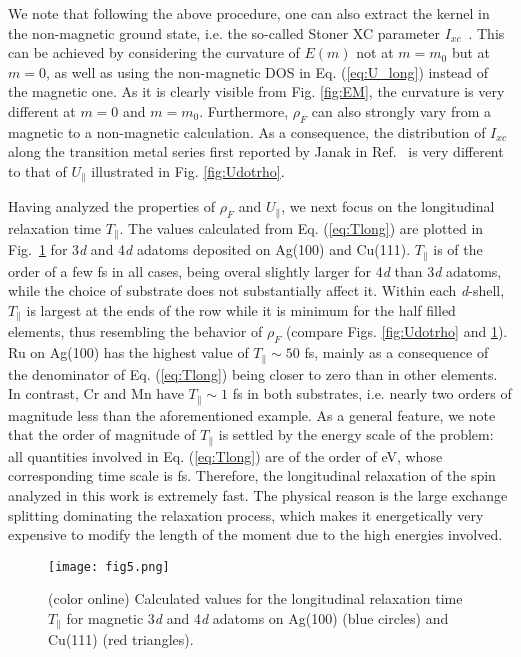 \documentclass[prb,footinbib,showpacs,twocolumn,amsmath,amssymb]{revtex4}
\begin{document}
We note that following the above procedure, one can also extract the 
kernel in the non-magnetic ground state,  
i.e. the so-called Stoner XC parameter $I_{xc}$~\cite{janak_uniform_1977}.
This can be achieved by considering the curvature of $E(m)$ not at $m=m_{0}$ but at
$m={0}$, as well as using the non-magnetic DOS in Eq. (\ref{eq:U_long})
instead of the magnetic one. As it is clearly visible from Fig. \ref{fig:EM}, 
the curvature is very different at $m={0}$ and $m=m_{0}$. 
Furthermore, $\rho_{F}$ can also strongly vary from a magnetic to a non-magnetic calculation.
As a consequence, the distribution of $I_{xc}$ along the transition metal series
first reported by Janak in Ref.~
is very different
to that of $U_{\parallel}$ illustrated in Fig. \ref{fig:Udotrho}.



Having analyzed the properties of
$\rho_{F}$ and $U_{\parallel}$, we next focus on the longitudinal relaxation time $T_{\parallel}$.
The values calculated from Eq. (\ref{eq:Tlong})
are plotted in Fig.~\ref{fig:Tparallel} for 3\textit{d} and 4\textit{d} adatoms deposited on Ag(100) and Cu(111). 
$T_{\parallel}$ is of the order of a few fs in all cases, being overal
slightly larger for 4\textit{d} than 3\textit{d} adatoms, while the choice of substrate
does not substantially affect it. 
Within each \textit{d}-shell, $T_{\parallel}$ is largest at the ends of the row 
while it is minimum for the half filled elements, thus resembling
the behavior of $\rho_{F}$ (compare Figs. \ref{fig:Udotrho} and \ref{fig:Tparallel}).
Ru on Ag(100) has the highest value of 
$T_{\parallel}\sim 50$ fs, mainly as a consequence of the denominator of 
Eq. (\ref{eq:Tlong}) being closer to zero than in other elements. 
In contrast,
Cr and Mn have $T_{\parallel}\sim 1$ fs in both substrates, i.e.
nearly two orders of magnitude less than the aforementioned example.
As a general feature, we note that the order of magnitude of $T_{\parallel}$ 
is settled by the energy scale of the problem:
all quantities involved in Eq. (\ref{eq:Tlong}) are of the order of eV,
whose corresponding time scale is fs.
Therefore, the longitudinal relaxation of the spin analyzed in this work is extremely fast.
The physical reason is the large exchange splitting dominating the relaxation process,
which makes it energetically very expensive to modify the length of the moment
due to the high energies involved.



\begin{figure}[b]
\texttt{[image: fig5.png]}
\caption{(color online) Calculated values for the longitudinal relaxation time 
$T_{\parallel}$ for magnetic 3\textit{d} and 4\textit{d} 
    adatoms on Ag(100) (blue circles) and Cu(111) (red triangles).
}
\label{fig:Tparallel}
\end{figure}
\end{document}
